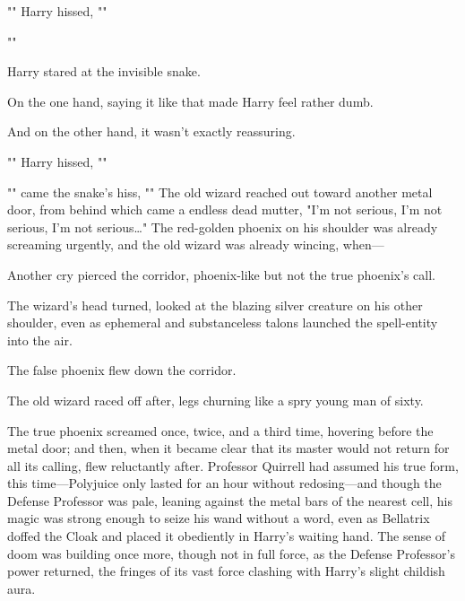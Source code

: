 "" Harry hissed, ""

""

Harry stared at the invisible snake.

On the one hand, saying it like that made Harry feel rather dumb.

And on the other hand, it wasn't exactly reassuring.

"" Harry hissed, ""

"" came the snake's hiss, ""
\sbreak
The old wizard reached out toward another metal door, from behind which came a 
endless dead mutter, "I'm not serious, I'm not serious, I'm not 
serious{\ldots}" The red-golden phoenix on his shoulder was already screaming 
urgently, and the old wizard was already wincing, when---

Another cry pierced the corridor, phoenix-like but not the true phoenix's call.

The wizard's head turned, looked at the blazing silver creature on his other 
shoulder, even as ephemeral and substanceless talons launched the spell-entity 
into the air.

The false phoenix flew down the corridor.

The old wizard raced off after, legs churning like a spry young man of sixty.

The true phoenix screamed once, twice, and a third time, hovering before the 
metal door; and then, when it became clear that its master would not return for 
all its calling, flew reluctantly after.
\sbreak
Professor Quirrell had assumed his true form, this time---Polyjuice only lasted 
for an hour without redosing---and though the Defense Professor was pale, 
leaning against the metal bars of the nearest cell, his magic was strong enough 
to seize his wand without a word, even as Bellatrix doffed the Cloak and placed 
it obediently in Harry's waiting hand. The sense of doom was building once 
more, though not in full force, as the Defense Professor's power returned, the 
fringes of its vast force clashing with Harry's slight childish aura.

